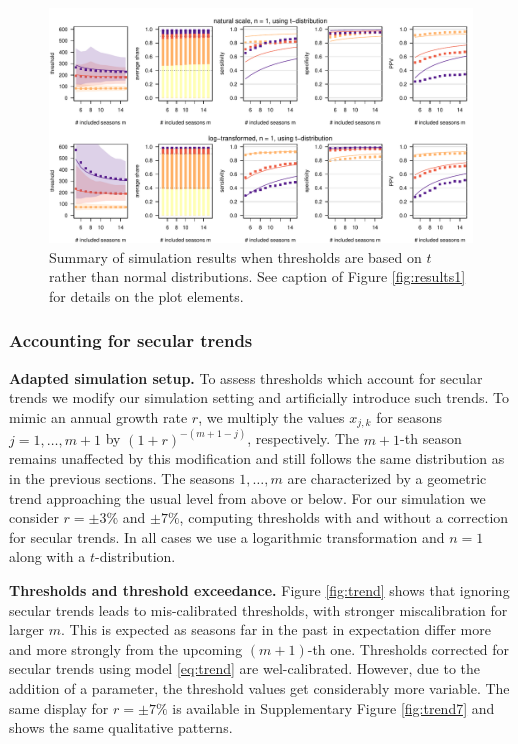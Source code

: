\documentclass[12pt]{article}
\begin{document}
\begin{figure}[h!]
\begin{center}
\includegraphics[width = \textwidth]{figure/plot_t_fr_small.pdf}
\end{center}
\caption{Summary of simulation results when thresholds are based on $t$ rather than normal distributions. See caption of Figure \ref{fig:results1} for details on the plot elements.}
\label{fig:t}
\end{figure}

\subsubsection{Accounting for secular trends}
\label{subsec:results_trends}

\textbf{Adapted simulation setup.} To assess thresholds which account for secular trends we modify our simulation setting and artificially introduce such trends. To mimic an annual growth rate $r$, we multiply the values $x_{j, k}$ for seasons $j = 1, \dots, m + 1$ by $(1 + r)^{-(m + 1 - j)}$, respectively. The $m + 1$-th season remains unaffected by this modification and still follows the same distribution as in the previous sections. The seasons $1, \dots, m$ are characterized by a geometric trend approaching the usual level from above or below. For our simulation we consider $r = \pm 3\%$ and $\pm 7\%$, computing thresholds with and without a correction for secular trends. In all cases we use a logarithmic transformation and $n = 1$ along with a $t$-distribution.

\noindent \textbf{Thresholds and threshold exceedance.} Figure \ref{fig:trend} shows that ignoring secular trends leads to mis-calibrated thresholds, with stronger miscalibration for larger $m$. This is expected as seasons far in the past in expectation differ more and more strongly from the upcoming $(m + 1)$-th one. Thresholds corrected for secular trends using model \eqref{eq:trend} are wel-calibrated. However, due to the addition of a parameter, the threshold values get considerably more variable. The same display for $r = \pm 7\%$ is available in Supplementary Figure \ref{fig:trend7} and shows the same qualitative patterns.
\end{document}

